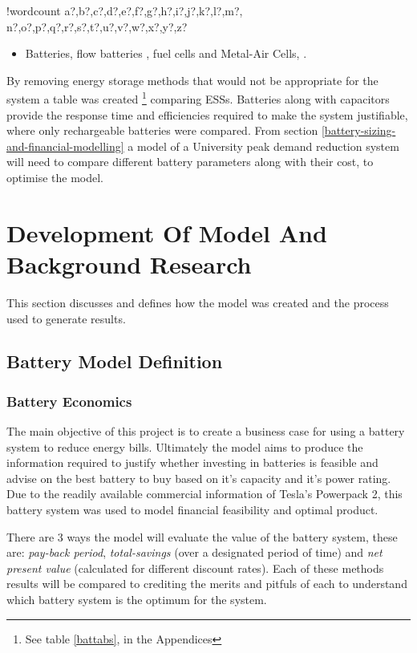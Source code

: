 \documentclass[fontsize=9.5pt]{extarticle}
\providecommand{\tightlist}{%
  \setlength{\itemsep}{0pt}\setlength{\parskip}{0pt}}
\newcounter{words}
\newenvironment{counted}{%
  \setcounter{words}{0}
  \SearchList!{wordcount}{\stepcounter{words}}
    {a?,b?,c?,d?,e?,f?,g?,h?,i?,j?,k?,l?,m?,
    n?,o?,p?,q?,r?,s?,t?,u?,v?,w?,x?,y?,z?}
  \UndoBoundary{'}
  \SearchOrder{p;}}{%
  \StopSearching}
\begin{document}
\begin{counted}
\begin{itemize}
  \begin{itemize}
  \tightlist
  \item
    Batteries, flow batteries \cite{flowbatstan}, fuel cells and
    Metal-Air Cells\cite{Chen2009291}, \cite{batuni}.
  \end{itemize}
\end{itemize}

By removing energy storage methods that would not be appropriate for the
system a table was created
\footnote{See table \ref{battabs}, in the Appendices} comparing ESSs.
Batteries along with capacitors provide the response time
\cite{Choudar201521} and efficiencies required to make the system
justifiable, where only rechargeable batteries were compared. From
section \ref{battery-sizing-and-financial-modelling} a model of a
University peak demand reduction system will need to compare different
battery parameters along with their cost, to optimise the model.

\newpage

\section{Development Of Model And Background
Research}\label{development-of-model-and-background-research}

This section discusses and defines how the model was created and the
process used to generate results.

\subsection{Battery Model Definition}\label{battery-model-definition}

\subsubsection{Battery Economics}\label{battery-economics}

The main objective of this project is to create a business case for
using a battery system to reduce energy bills. Ultimately the model aims
to produce the information required to justify whether investing in
batteries is feasible and advise on the best battery to buy based on
it's capacity and it's power rating. Due to the readily available
commercial information of Tesla's Powerpack 2, this battery system was
used to model financial feasibility and optimal product.

There are 3 ways the model will evaluate the value of the battery
system, these are: \emph{pay-back period}, \emph{total-savings} (over a
designated period of time) and \emph{net present value} (calculated for
different discount rates). Each of these methods results will be
compared to crediting the merits and pitfuls of each to understand which
battery system is the optimum for the system.


\end{counted}
\end{document}
